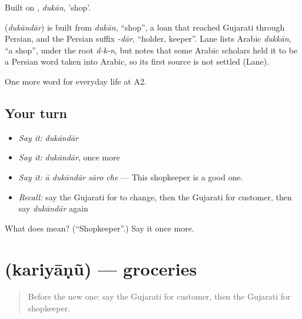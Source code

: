 Built on \textbf{}, \emph{dukān}, 'shop'.

\begin{cousinweb}
\textbf{} (\emph{dukāndār}) is built from \emph{dukān}, \textquotedblleft{}shop\textquotedblright{}, a loan that reached Gujarati through Persian, and the Persian suffix \emph{-dār}, \textquotedblleft{}holder, keeper\textquotedblright{}. Lane lists Arabic \emph{dukkān}, \textquotedblleft{}a shop\textquotedblright{}, under the root \emph{d-k-n}, but notes that some Arabic scholars held it to be a Persian word taken into Arabic, so its first source is not settled (Lane).
\end{cousinweb}

\begin{grammarlens}[title={What you've built}]
One more word for everyday life at A2.
\end{grammarlens}

\subsection*{Your turn}
\begin{itemize}
\raggedright
  \item \emph{Say it:} \emph{dukāndār}
  \item \emph{Say it:} \emph{dukāndār}, once more
  \item \emph{Say it:} \emph{ā dukāndār sāro che} — This shopkeeper is a good one.
  \item \emph{Recall:} say the Gujarati for to change, then the Gujarati for customer, then say \emph{dukāndār} again
\end{itemize}

\begin{tcolorbox}[breakable,colback=teal!4,colframe=teal!35!black,title={Before you move on}]
What does  mean? (\textquotedblleft{}Shopkeeper\textquotedblright{}.) Say it once more.
\end{tcolorbox}
\section[\texorpdfstring{\gu{કરિયાણું} (kariyāṇũ)}{કરિયાણું (kariyāṇũ)}]{ (kariyāṇũ) — groceries}

\label{lesson:GU-C183-kariyanu}



\begin{quote}
Before the new one: say the Gujarati for customer, then the Gujarati for shopkeeper.
\end{quote}

